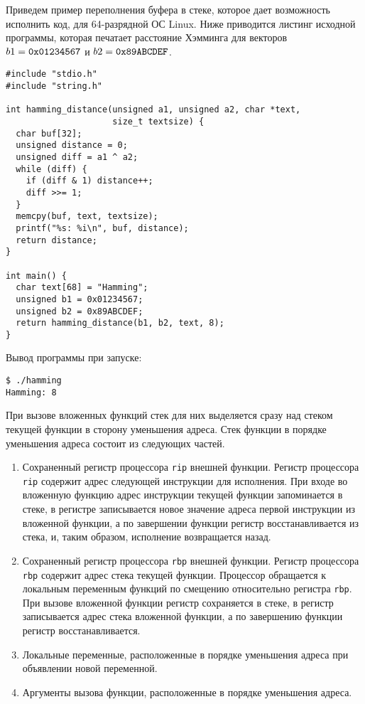 Приведем пример переполнения буфера в стеке, которое дает возможность исполнить код, для 64-разрядной ОС Linux. Ниже приводится листинг исходной программы, которая печатает расстояние Хэмминга для векторов $b1 = \text{\texttt{0x01234567}}$ и $b2 = \text{\texttt{0x89ABCDEF}}$.

\begin{verbatim}
#include "stdio.h"
#include "string.h"

int hamming_distance(unsigned a1, unsigned a2, char *text,
                     size_t textsize) {
  char buf[32];
  unsigned distance = 0;
  unsigned diff = a1 ^ a2;
  while (diff) {
    if (diff & 1) distance++;
    diff >>= 1;
  }
  memcpy(buf, text, textsize);
  printf("%s: %i\n", buf, distance);
  return distance;
}

int main() {
  char text[68] = "Hamming";
  unsigned b1 = 0x01234567;
  unsigned b2 = 0x89ABCDEF;
  return hamming_distance(b1, b2, text, 8);
}
\end{verbatim}

Вывод программы при запуске:
\begin{verbatim}
$ ./hamming
Hamming: 8
\end{verbatim}

При вызове вложенных функций стек для них выделяется сразу над стеком текущей функции в сторону уменьшения адреса. Стек функции в порядке уменьшения адреса состоит из следующих частей.
\begin{enumerate}
    \item Сохраненный регистр процессора \texttt{rip} внешней функции. Регистр процессора \texttt{rip} содержит адрес следующей инструкции для исполнения. При входе во вложенную функцию адрес инструкции текущей функции запоминается в стеке, в регистре записывается новое значение адреса первой инструкции из вложенной функции, а по завершении функции регистр восстанавливается из стека, и, таким образом, исполнение возвращается назад.
    \item Сохраненный регистр процессора \texttt{rbp} внешней функции. Регистр процессора \texttt{rbp} содержит адрес стека текущей функции. Процессор обращается к локальным переменным функций по смещению относительно регистра \texttt{rbp}. При вызове вложенной функции регистр сохраняется в стеке, в регистр записывается адрес стека вложенной функции, а по завершению функции регистр восстанавливается.
    \item Локальные переменные, расположенные в порядке уменьшения адреса при объявлении новой переменной.
    \item Аргументы вызова функции, расположенные в порядке уменьшения адреса.
\end{enumerate}

